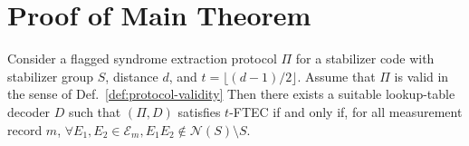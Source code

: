 \newpage
\appendix
\section{Proof of Main Theorem}
\label{app:proof}

\begin{theorem}
\label{thm:mains}
 Consider a flagged syndrome extraction protocol $\Pi$ for a stabilizer code
with stabilizer group $S$, distance $d$, and
$t=\lfloor (d-1)/2 \rfloor$. Assume that $\Pi$ is valid in the sense of Def.~\ref{def:protocol-validity}
Then there exists a suitable lookup-table decoder $D$ such that $(\Pi,D)$ satisfies
$t$-FTEC if and only if, for all measurement record $m$,
$\forall E_1,E_2\in \mathcal{E}_{m},
    E_1E_2 \notin \mathcal{N}(S)\setminus S$.  
\end{theorem}\label{thm:ftec-verify}


